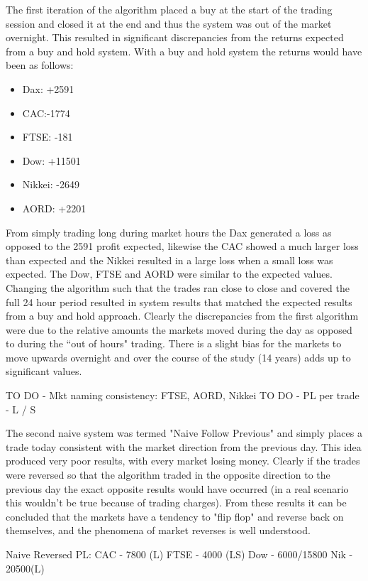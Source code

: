 The first iteration of the algorithm placed a buy at the start of the trading session and closed it at the end and thus the system was out of the market overnight. This resulted in significant discrepancies from the returns expected from a buy and hold system. With a buy and hold system the returns would have been as follows:

\begin{itemize}
\item Dax: +2591
\item CAC:-1774
\item FTSE: -181
\item Dow: +11501
\item Nikkei: -2649
\item AORD: +2201
\end{itemize}

From simply trading long during market hours the Dax generated a loss as opposed to the 2591 profit expected, likewise the CAC showed a much larger loss than expected and the Nikkei resulted in a large loss when a small loss was expected. The Dow, FTSE and AORD were similar to the expected values. Changing the algorithm such that the trades ran close to close and covered the full 24 hour period resulted in system results that matched the expected results from a buy and hold approach.  Clearly the discrepancies from the first algorithm were due to the relative amounts the markets moved during the day as opposed to during the \textquotedblleft out of hours" trading. There is a slight bias for the markets to move upwards overnight and over the course of the study (14 years) adds up to significant values.  

TO DO - Mkt naming consistency: FTSE, AORD, Nikkei 
TO DO - PL per trade - L / S

The second naive system was termed "Naive Follow Previous" and simply places a trade today consistent with the market direction from the previous day. This idea produced very poor results, with every market losing money. Clearly if the trades were reversed so that the algorithm traded in the opposite direction to the previous day the exact opposite results would have occurred (in a real scenario this wouldn't be true because of trading charges).  From these results it can be concluded that the markets have a tendency to "flip flop" and reverse back on themselves, and the phenomena of market reverses is well understood.

Naive Reversed PL:
CAC - 7800 (L)
FTSE - 4000 (LS)
Dow - 6000/15800
Nik - 20500(L)

